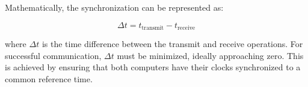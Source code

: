 Mathematically, the synchronization can be represented as:

\[
\Delta t = t_{\text{transmit}} - t_{\text{receive}}
\]

where \(\Delta t\) is the time difference between the transmit and receive operations. For successful communication, \(\Delta t\) must be minimized, ideally approaching zero. This is achieved by ensuring that both computers have their clocks synchronized to a common reference time.

